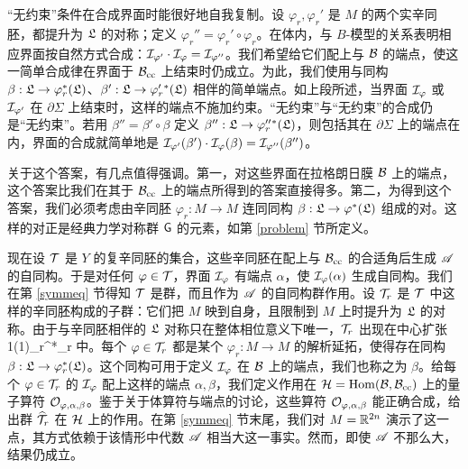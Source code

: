 “无约束”条件在合成界面时能很好地自我复制。设 $\varphi_r,\varphi_r'$ 是 $M$ 的两个实辛同胚，都提升为 ${\mathfrak L}$ 的对称；定义 $\varphi_r''=\varphi_r'\circ\varphi_r$。在体内，与 $B$-模型的关系表明相应界面按自然方式合成：${\mathcal I}_{\varphi'}\cdot{\mathcal I}_\varphi={\mathcal I}_{\varphi''}$。我们希望给它们配上与 ${\mathcal B}$ 的端点，使这一简单合成律在界面于 ${\mathcal B}_{\mathrm{cc}}$ 上结束时仍成立。为此，我们使用与同构 $\beta:{\mathfrak L}\to\varphi_r^*({\mathfrak L})$、$\beta':{\mathfrak L}\to\varphi_r'{}^*({\mathfrak L})$ 相伴的简单端点。如上段所述，当界面 ${\mathcal I}_\varphi$ 或 ${\mathcal I}_{\varphi'}$ 在 $\partial\Sigma$ 上结束时，这样的端点不施加约束。“无约束”与“无约束”的合成仍是“无约束”。若用 $\beta''=\beta'\circ\beta$ 定义 $\beta'':{\mathfrak L}\to\varphi_r''{}^*({\mathfrak L})$，则包括其在 $\partial\Sigma$ 上的端点在内，界面的合成就简单地是 ${\mathcal I}_{\varphi'}(\beta')\cdot{\mathcal I}_\varphi(\beta)={\mathcal I}_{\varphi''}(\beta'')$。

关于这个答案，有几点值得强调。第一，对这些界面在拉格朗日膜 ${\mathcal B}$ 上的端点，这个答案比我们在其于 ${\mathcal B}_{\mathrm{cc}}$ 上的端点所得到的答案直接得多。第二，为得到这个答案，我们必须考虑由辛同胚 $\varphi_r:M\to M$ 连同同构 $\beta:{\mathfrak L}\to\varphi^*({\mathfrak L})$ 组成的对。这样的对正是经典力学对称群 ${\text{\sf G}}$ 的元素，如第 \ref{problem} 节所定义。

现在设 ${\mathcal T}$ 是 $Y$ 的复辛同胚的集合，这些辛同胚在配上与 ${\mathcal B}_{\mathrm{cc}}$ 的合适角后生成 ${\mathscr A}$ 的自同构。于是对任何 $\varphi\in{\mathcal T}$，界面 ${\mathcal I}_\varphi$ 有端点 $\alpha$，使 ${\mathcal I}_\varphi(\alpha)$ 生成自同构。我们在第 \ref{symmeq} 节得知 ${\mathcal T}$ 是群，而且作为 ${\mathscr A}$ 的自同构群作用。设 ${\mathcal T}_r$ 是 ${\mathcal T}$ 中这样的辛同胚构成的子群：它们把 $M$ 映到自身，且限制到 $M$ 上时提升为 ${\mathfrak L}$ 的对称。由于与辛同胚相伴的 ${\mathfrak L}$ 对称只在整体相位意义下唯一，${\mathcal T}_r$ 出现在中心扩张
\be\label{zirko}1\to\UU(1)\to\T_r^*\to\T_r\ee
中。每个 $\varphi\in{\mathcal T}_r$ 都是某个 $\varphi_r:M\to M$ 的解析延拓，使得存在同构 $\beta:{\mathfrak L}\to\varphi_r^*({\mathfrak L})$。这个同构可用于定义 ${\mathcal I}_\varphi$ 在 ${\mathcal B}$ 上的端点，我们也称之为 $\beta$。给每个 $\varphi\in{\mathcal T}_r$ 的 ${\mathcal I}_\varphi$ 配上这样的端点 $\alpha,\beta$，我们定义作用在 ${\mathcal H}={\mathrm{Hom}}({\mathcal B},{\mathcal B}_{\mathrm{cc}})$ 上的量子算符 ${\mathcal O}_{\varphi,\alpha,\beta}$。鉴于关于体算符与端点的讨论，这些算符 ${\mathcal O}_{\varphi,\alpha,\beta}$ 能正确合成，给出群 $\widehat{{\mathcal T}}_r$ 在 ${\mathcal H}$ 上的作用。在第 \ref{symmeq} 节末尾，我们对 $M={\mathbb R}^{2n}$ 演示了这一点，其方式依赖于该情形中代数 ${\mathscr A}$ 相当大这一事实。然而，即使 ${\mathscr A}$ 不那么大，结果仍成立。
